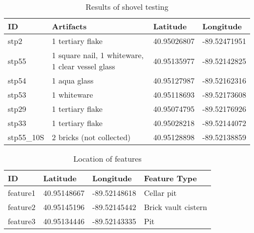 \documentclass{article}
\begin{document}
\pagebreak

\begin{table}[]
	\centering
	\caption{Results of shovel testing}
	\label{table_2}
	\begin{tabular}{llll}
		\hline
		ID         & Artifacts                                        & Latitude    & Longitude    \\ \hline
		stp2       & 1 tertiary flake                                 & 40.95026807 & -89.52471951 \\
		stp55      & 1 square nail, 1 whiteware, 1 clear vessel glass & 40.95135977 & -89.52142825 \\
		stp54      & 1 aqua glass                                     & 40.95127987 & -89.52162316 \\
		stp53      & 1 whiteware                                      & 40.95118693 & -89.52173608 \\
		stp29      & 1 tertiary flake                                 & 40.95074795 & -89.52176926 \\
		stp33      & 1 tertiary flake                                 & 40.95028218 & -89.52144072 \\
		stp55\_10S & 2 bricks (not collected)                         & 40.95128898 & -89.52138859 \\ \hline
	\end{tabular}
\end{table}

\begin{table}[]
	\centering
	\caption{Location of features}
	\label{table_3}
	\begin{tabular}{llll}
		\hline
		ID       & Latitude    & Longitude    & Feature Type        \\ \hline
		feature1 & 40.95148667 & -89.52148618 & Cellar pit          \\
		feature2 & 40.95145196 & -89.52145442 & Brick vault cistern \\
		feature3 & 40.95134446 & -89.52143335 & Pit                 \\ \hline
	\end{tabular}
\end{table}
\end{document}
